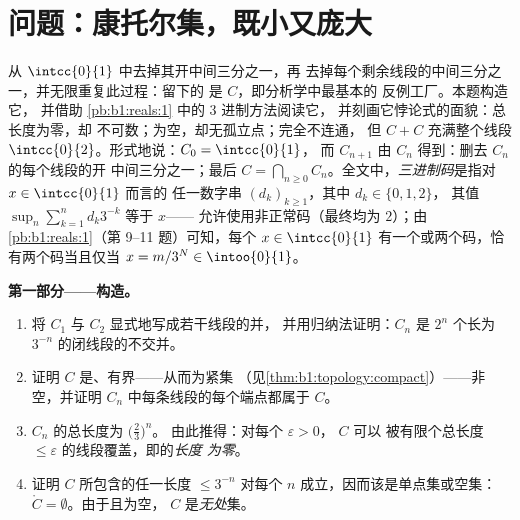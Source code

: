 \section{问题：康托尔集，既小又庞大}

\begin{problem}[{周末问题——康托尔三分集：
长度为零、不可数、完备，且 $C + C =
\intcc{0}{2}$}]
\label{pb:b1:topology:1}
从 $\intcc{0}{1}$ 中去掉其开中间三分之一，再
去掉每个剩余线段的中间三分之一，并无限重复此过程：留下的
是\emph{} $C$，即分析学中最基本的
反例工厂。本题构造它，
并借助 \cref{pb:b1:reals:1} 中的 $3$ 进制方法阅读它，
并刻画它悖论式的面貌：总长度为零，却
不可数；为空，却无孤立点；完全不连通，
但 $C + C$ 充满整个线段
$\intcc{0}{2}$。形式地说：$C_0 = \intcc{0}{1}$，
        而 $C_{n+1}$ 由 $C_n$ 得到：删去 $C_n$ 的每个线段的开
        中间三分之一；最后 $C = \bigcap_{n \geq 0}
C_n$。全文中，\emph{三进制码}是指对 $x \in \intcc{0}{1}$ 而言的
        任一数字串 $(d_k)_{k\geq1}$，其中 $d_k \in \{0, 1, 2\}$，
        其值 $\sup_n \sum_{k=1}^n d_k 3^{-k}$ 等于 $x$——
        允许使用非正常码（最终均为 $2$）；由
        \cref{pb:b1:reals:1}（第 9--11 题）可知，每个 $x \in
\intcc{0}{1}$ 有一个或两个码，恰有两个码当且仅当 $x = m/3^N
\in \intoo{0}{1}$。

\medskip
\noindent\textbf{第一部分——构造。}
\begin{enumerate}
  \item 将 $C_1$ 与 $C_2$ 显式地写成若干线段的并，
        并用归纳法证明：$C_n$ 是
        $2^n$ 个长为 $3^{-n}$ 的闭线段的不交并。
  \item 证明 $C$ 是、有界——从而为紧集
        （见\cref{thm:b1:topology:compact}）——非空，并证明
        $C_n$ 中每条线段的每个端点都属于
        $C$。
  \item $C_n$ 的总长度为 $\bigl(\frac23\bigr)^n$。
        由此推得：对每个 $\varepsilon > 0$， $C$ 可以
        被有限个总长度
        $\leq \varepsilon$ 的线段覆盖，即的\emph{长度
        为零}。
  \item 证明 $C$ 所包含的任一长度 $\leq
        3^{-n}$ 对每个 $n$ 成立，因而该是单点集或空集：
        $\mathring C = \emptyset$。由于且为空，
        $C$ 是\emph{无处}集。
\end{enumerate}


\end{problem}
